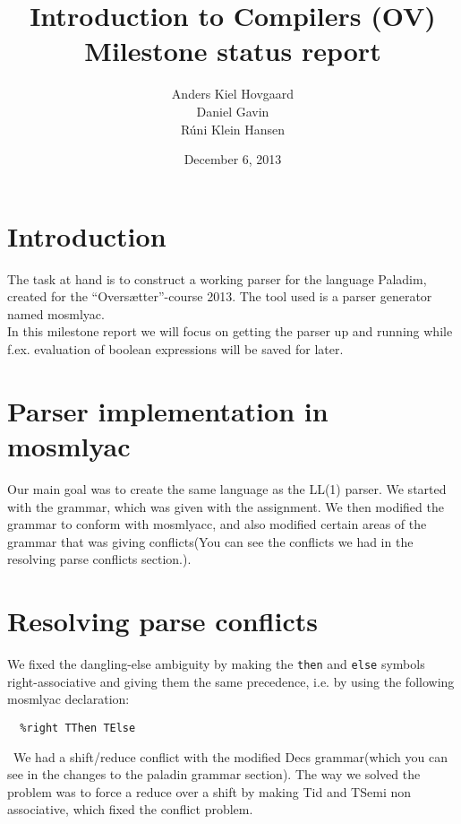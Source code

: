 \documentclass[12pt,a4paper]{article}
\begin{document}
\title{Introduction to Compilers (OV)\\
       Milestone status report}
\author{Anders Kiel Hovgaard\\
        Daniel Gavin\\
        Rúni Klein Hansen}
\date{December 6, 2013}
\maketitle

\section{Introduction}
The task at hand is to construct a working parser for the language Paladim,
created for the ``Oversætter''-course 2013. The tool used is a parser generator
named mosmlyac.\\
In this milestone report we will focus on getting the parser up and running
while f.ex. evaluation of boolean expressions will be saved for later.


\section{Parser implementation in mosmlyac}

Our main goal was to create the same language as the LL(1) parser. We started with the grammar, which was given with the 
assignment. We then modified the grammar to conform with mosmlyacc, and also modified certain areas of the grammar that was
giving conflicts(You can see the conflicts we had in the resolving parse conflicts section.).


\section{Resolving parse conflicts}
We fixed the dangling-else ambiguity by making the \texttt{then} and
\texttt{else} symbols right-associative and giving them the same precedence,
i.e. by using the following mosmlyac declaration:

\begin{verbatim}
  %right TThen TElse 
\end{verbatim}
\
We had a shift/reduce conflict with the modified Decs grammar(which you can see in the changes to the paladin grammar section). The
way we solved the problem was to force a reduce over a shift by making Tid and TSemi non associative, which fixed the conflict problem.
\end{document}
